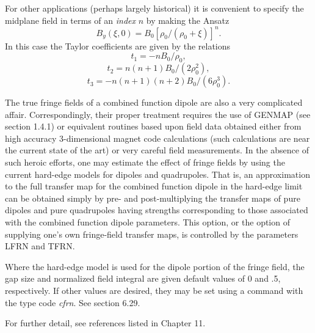 For other applications (perhaps largely historical) it is convenient to specify the midplane field in terms of an {\em index} $n$ by making the Ansatz
\begin{equation}
B_y(\xi ,0) = B_0[\rho_0/(\rho_0 + \xi)]^n.
\end{equation}
In this case the Taylor coefficients are given by the relations
\begin{equation}
t_1 = -nB_0/\rho_0,
\end{equation}
\begin{equation}
t_2 = n(n+1) B_0/(2\rho_0^2),
\end{equation}
\begin{equation}
t_3 = -n(n+1)(n+2) B_0/(6\rho_0^3).
\end{equation}
 

     The true fringe fields of a combined function dipole are also a very
complicated affair.  Correspondingly, their proper treatment requires the
use of GENMAP (see section 1.4.1) or equivalent routines based upon field data obtained either from high accuracy 3-dimensional magnet code calculations (such calculations are near the current state of the art) or very careful field measurements.  In the absence of such heroic efforts, one may estimate the effect of fringe fields by using the current \Mary hard-edge models for dipoles and quadrupoles.  That is, an approximation to the full transfer map for the combined function dipole in the hard-edge limit can be obtained simply by pre- and post-multiplying the transfer maps of pure dipoles and pure quadrupoles having strengths corresponding to those associated with the combined function dipole parameters.  This option, or the option of supplying one's own fringe-field transfer maps, is controlled by the parameters LFRN and TFRN.

Where the \Mary hard-edge model is used for the dipole portion of the fringe field, the gap size and normalized field integral are given default values of 0 and .5, respectively.  If other values are desired, they may be set using a command with the type code
{\em cfrn}.  See section 6.29.

For further detail, see references listed in Chapter 11.


\clearpage

